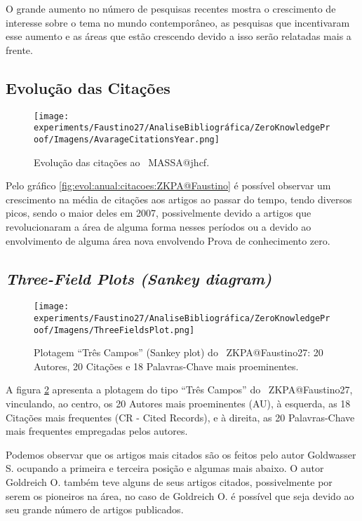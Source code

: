 O grande aumento no número de pesquisas recentes mostra o crescimento de interesse sobre o tema no mundo contemporâneo, as pesquisas que incentivaram esse aumento e as áreas que estão crescendo devido a isso serão relatadas mais a frente.

\subsection{Evolução das Citações}

\begin{figure}
    \centering
    \texttt{[image: experiments/Faustino27/AnaliseBibliográfica/ZeroKnowledgeProof/Imagens/AvarageCitationsYear.png]}
    \caption{Evolução das citações ao \dataset\   MASSA@jhcf.}
    \label{fig:evol:anual:citacoes:ZKPA@Faustino27}
\end{figure}

Pelo gráfico \ref{fig:evol:anual:citacoes:ZKPA@Faustino} é possível observar um crescimento na média de citações aos artigos ao passar do tempo, tendo diversos picos, sendo o maior deles em 2007, possivelmente devido a artigos que revolucionaram a área de alguma forma nesses períodos ou a devido ao envolvimento de alguma área nova envolvendo Prova de conhecimento zero.

\subsection{\textit{Three-Field Plots (Sankey diagram)}}

\begin{figure}
    \centering
    \texttt{[image: experiments/Faustino27/AnaliseBibliográfica/ZeroKnowledgeProof/Imagens/ThreeFieldsPlot.png]}
    \caption{Plotagem ``Três Campos'' (Sankey plot) do \dataset\   ZKPA@Faustino27: 20 Autores, 20 Citações e 18 Palavras-Chave mais proeminentes.}
    \label{fig:ZKPA@Faustino27:ThreeFieldPlot}
\end{figure}

A figura \ref{fig:ZKPA@Faustino27:ThreeFieldPlot} apresenta a plotagem do tipo ``Três Campos'' do \dataset\  ZKPA@Faustino27, vinculando, ao centro, os 20 Autores mais proeminentes (AU), à esquerda, as 18 Citações mais frequentes (CR - Cited Records), e à direita, as 20 Palavras-Chave mais frequentes empregadas pelos autores.

Podemos observar que os artigos mais citados são os feitos pelo autor Goldwasser S. ocupando a primeira e terceira posição e algumas mais abaixo. O autor Goldreich O. também teve alguns de seus artigos citados, possivelmente por serem os pioneiros na área, no caso de Goldreich O. é possível que seja devido ao seu grande número de artigos publicados.

